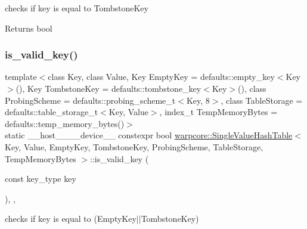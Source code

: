 checks if {\ttfamily key} is equal to {\ttfamily Tombstone\+Key} 

\begin{DoxyReturn}{Returns}
{\ttfamily bool} 
\end{DoxyReturn}
\mbox{\label{classwarpcore_1_1SingleValueHashTable_a46cd1b240746021179983e3263f427b5}} 
\subsubsection{\texorpdfstring{is\+\_\+valid\+\_\+key()}{is\_valid\_key()}}
{\footnotesize\ttfamily template$<$class Key, class Value, Key Empty\+Key = defaults\+::empty\+\_\+key$<$\+Key$>$(), Key Tombstone\+Key = defaults\+::tombstone\+\_\+key$<$\+Key$>$(), class Probing\+Scheme = defaults\+::probing\+\_\+scheme\+\_\+t$<$\+Key, 8$>$, class Table\+Storage = defaults\+::table\+\_\+storage\+\_\+t$<$\+Key, Value$>$, index\+\_\+t Temp\+Memory\+Bytes = defaults\+::temp\+\_\+memory\+\_\+bytes()$>$ \\
static \+\_\+\+\_\+host\+\_\+\+\_\+\+\_\+\+\_\+device\+\_\+\+\_\+ constexpr bool \hyperlink{classwarpcore_1_1SingleValueHashTable}{warpcore\+::\+Single\+Value\+Hash\+Table}$<$ Key, Value, Empty\+Key, Tombstone\+Key, Probing\+Scheme, Table\+Storage, Temp\+Memory\+Bytes $>$\+::is\+\_\+valid\+\_\+key (\begin{DoxyParamCaption}\item[{const key\+\_\+type}]{key }\end{DoxyParamCaption})\hspace{0.3cm}{\ttfamily [inline]}, {\ttfamily [static]}, {\ttfamily [noexcept]}}



checks if {\ttfamily key} is equal to {\ttfamily }(Empty\+Key$\vert$$\vert$\+Tombstone\+Key) 

